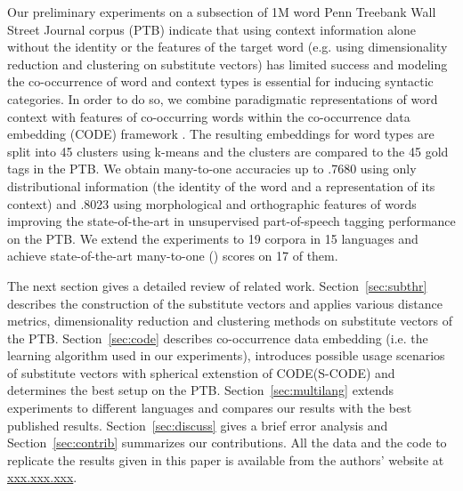 Our preliminary experiments on a subsection of 1M word Penn Treebank
Wall Street Journal corpus \cite{treebank3} (PTB) indicate that using
context information alone without the identity or the features of the
target word (e.g. using dimensionality reduction and clustering on
substitute vectors) has limited success and modeling the co-occurrence
of word and context types is essential for inducing syntactic
categories.  In order to do so, we combine paradigmatic
representations of word context with features of co-occurring words
within the co-occurrence data embedding (CODE) framework
\cite{globerson2007euclidean,maron2010sphere}.  The resulting
embeddings for word types are split into 45 clusters using k-means and
the clusters are compared to the 45 gold tags in the PTB.  We obtain
many-to-one accuracies up to .7680 using only distributional
information (the identity of the word and a representation of its
context) and .8023 using morphological and orthographic features of
words improving the state-of-the-art in unsupervised part-of-speech
tagging performance on the PTB.  We extend the experiments to 19
corpora in 15 languages and achieve state-of-the-art many-to-one
(\mto) scores on 17 of them.

The next section gives a detailed review of related work.
Section~\ref{sec:subthr} describes the construction of the substitute
vectors and applies various distance metrics, dimensionality reduction
and clustering methods on substitute vectors of the PTB.
Section~\ref{sec:code} describes co-occurrence data embedding
(i.e. the learning algorithm used in our experiments), introduces
possible usage scenarios of substitute vectors with spherical
extenstion of CODE(S-CODE) and determines the best setup on the PTB.
Section~\ref{sec:multilang} extends experiments to different languages
and compares our results with the best published results.
Section~\ref{sec:discuss} gives a brief error analysis and
Section~\ref{sec:contrib} summarizes our contributions.  All the data
and the code to replicate the results given in this paper is available
from the authors' website at \mbox{\url{xxx.xxx.xxx}}.


